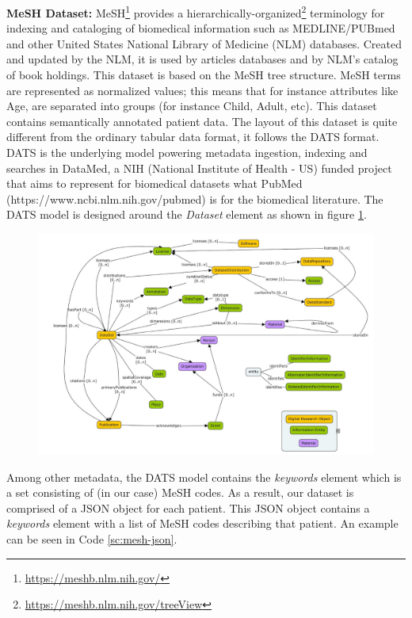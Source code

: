 \textbf{MeSH Dataset:}
MeSH\footnote{\href{https://meshb.nlm.nih.gov/}{https://meshb.nlm.nih.gov/}} provides a hierarchically-organized\footnote{\href{https://meshb.nlm.nih.gov/treeView}{https://meshb.nlm.nih.gov/treeView}} terminology for indexing and cataloging of biomedical information such as MEDLINE/PUBmed and other United States National Library of Medicine (NLM) databases.
Created and updated by the NLM, it is used by articles databases and by NLM's catalog of book holdings.
This dataset is based on the MeSH tree structure.
MeSH terms are represented as normalized values; this means that for instance attributes like Age, are separated into groups (for instance Child, Adult, etc).
This dataset contains semantically annotated patient data.
The layout of this dataset is quite different from the ordinary tabular data format, it follows the DATS format.
DATS is the underlying model powering metadata ingestion, indexing and searches in DataMed, a NIH (National Institute of Health - US) funded project that aims to represent for biomedical datasets what PubMed (https://www.ncbi.nlm.nih.gov/pubmed) is for the biomedical literature.
The DATS model is designed around the \textit{Dataset} element as shown in figure \ref{f:dats}.



\begin{figure}[H]
  \centering
  \includegraphics[width=\columnwidth]{figures/dats.png}
  \label{f:dats}
\end{figure}

Among other metadata, the DATS model contains the \textit{keywords} element which is a set consisting of (in our case) MeSH codes.
As a result, our dataset is comprised of a JSON object for each patient.
This JSON object contains a \textit{keywords} element with a list of MeSH codes describing that patient.
An example can be seen in Code \ref{sc:mesh-json}.


